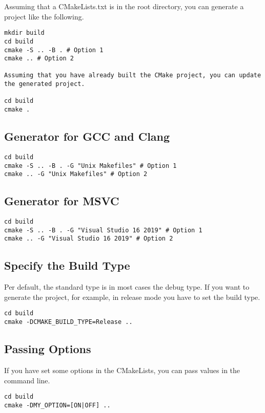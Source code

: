Assuming that a CMakeLists.txt is in the root directory, you can generate a project like the following.

\begin{verbatim}
mkdir build
cd build
cmake -S .. -B . # Option 1
cmake .. # Option 2

Assuming that you have already built the CMake project, you can update the generated project.

cd build
cmake .
\end{verbatim}

\subsection{Generator for GCC and Clang}

\begin{verbatim}
cd build
cmake -S .. -B . -G "Unix Makefiles" # Option 1
cmake .. -G "Unix Makefiles" # Option 2
\end{verbatim}

\subsection{Generator for MSVC}

\begin{verbatim}
cd build
cmake -S .. -B . -G "Visual Studio 16 2019" # Option 1
cmake .. -G "Visual Studio 16 2019" # Option 2
\end{verbatim}

\subsection{Specify the Build Type}

Per default, the standard type is in most cases the debug type.
If you want to generate the project, for example, in release mode you have to set the build type.

\begin{verbatim}
cd build
cmake -DCMAKE_BUILD_TYPE=Release ..
\end{verbatim}

\subsection{Passing Options}

If you have set some options in the CMakeLists, you can pass values in the command line.

\begin{verbatim}
cd build
cmake -DMY_OPTION=[ON|OFF] ..
\end{verbatim}

